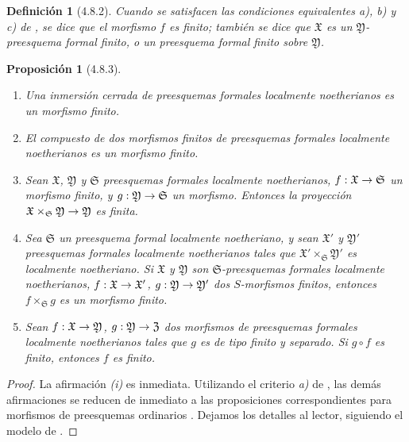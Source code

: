\documentclass[10pt,oneside,openany]{book}
\theoremstyle{egaenv}\newtheorem*{env}{---}
\theoremstyle{egastatement}
\newtheorem*{proposition}{Proposición}
\theoremstyle{egadescription}
\newtheorem*{definition}{Definición}
\renewcommand{\to}{\mathchoice{\longrightarrow}{\rightarrow}{\rightarrow}{\rightarrow}}
\begin{document}
\begin{definition}[4.8.2]
\label{III.4.8.2}
\label{III.4.8.2-fr}
Cuando se satisfacen las condiciones equivalentes \textup{a)}, \textup{b)} y \textup{c)}
de , se dice que el morfismo $f$ es
finito; también se dice que $\mathfrak X$ es un
$\mathfrak Y$-preesquema formal finito, o un preesquema
formal finito sobre $\mathfrak Y$.
\end{definition}

\begin{proposition}[4.8.3]
\label{III.4.8.3}
\label{III.4.8.3-fr}
\begin{enumerate}
  \item[\rm{(i)}] Una inmersión cerrada de preesquemas formales localmente
    noetherianos es un morfismo finito.
  \item[\rm{(ii)}] El compuesto de dos morfismos finitos de preesquemas formales
    localmente noetherianos es un morfismo finito.
  \item[\rm{(iii)}] Sean $\mathfrak X$, $\mathfrak Y$ y
    $\mathfrak S$ preesquemas formales localmente noetherianos,
    $f:\mathfrak X\to\mathfrak S$ un morfismo finito, y
    $g:\mathfrak Y\to\mathfrak S$ un morfismo. Entonces la proyección
    $\mathfrak X\times_{\mathfrak S}\mathfrak Y\to\mathfrak Y$
    es finita.
  \item[\rm{(iv)}] Sea $\mathfrak S$ un preesquema formal localmente
    noetheriano, y sean $\mathfrak X'$ y $\mathfrak Y'$
    preesquemas formales localmente noetherianos tales que
    $\mathfrak X'\times_{\mathfrak S}\mathfrak Y'$ es localmente
    noetheriano. Si $\mathfrak X$ y $\mathfrak Y$ son
    $\mathfrak S$-preesquemas formales localmente noetherianos,
  $f:\mathfrak X\to\mathfrak X'$, $g:\mathfrak Y\to\mathfrak Y'$ dos
  $S$-morfismos finitos, entonces
    $f\times_{\mathfrak S}g$ es un
  morfismo finito.
\item[\textup{(v)}] Sean $f:\mathfrak X\to\mathfrak Y$,
  $g:\mathfrak Y\to\mathfrak Z$ dos morfismos de preesquemas formales
  localmente noetherianos tales que $g$ es de tipo finito y separado. Si $g\circ f$ es finito,
    entonces $f$ es finito.
\end{enumerate}
\end{proposition}

\begin{proof}
La afirmación \emph{(i)} es inmediata. Utilizando el criterio \emph{a)} de
, las demás afirmaciones se reducen de inmediato a las
proposiciones correspondientes para morfismos de preesquemas ordinarios
. Dejamos los detalles al lector, siguiendo
el modelo de .
\end{proof}
\end{document}
